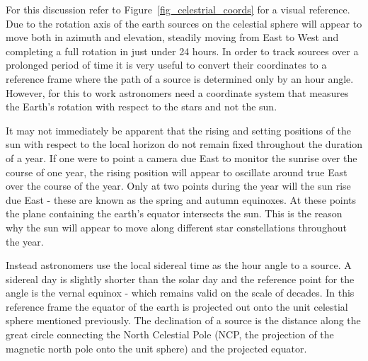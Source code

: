For this discussion refer to Figure~\ref{fig_celestrial_coords} for a visual reference. Due to the rotation 
axis of the earth sources on the celestial sphere will appear to move both in azimuth and elevation, steadily moving from East to 
West and completing a full rotation in just under 24 hours. In order to track sources over a prolonged period of time it is very 
useful to convert their coordinates to a reference frame where the path of a source is determined only by an hour angle. However, for this 
to work astronomers need a coordinate system that measures the Earth's rotation with respect to the stars and not the sun. 

It may not immediately be apparent that the rising and setting positions of the sun with respect to the local horizon do not remain fixed 
throughout the duration of a year. If one were to point a camera due East to monitor the sunrise over the course of one year, the rising 
position will appear to oscillate around true East over the course of the year. Only at two points during the year will the sun rise due East - 
these are known as the spring and autumn equinoxes. At these points the plane containing the earth's equator intersects the sun. This is the 
reason why the sun will appear to move along different star constellations throughout the year. 

Instead astronomers use the local sidereal time as the hour angle to a source. A sidereal day is slightly shorter than the solar day and the reference 
point for the angle is the vernal equinox - which remains valid on the scale of decades. In this reference frame the equator of the earth is projected 
out onto the unit celestial sphere mentioned previously. The declination of a source is the distance along the great circle 
connecting the North Celestial Pole (NCP, the projection of the magnetic north pole onto the unit sphere) and the 
projected equator.

